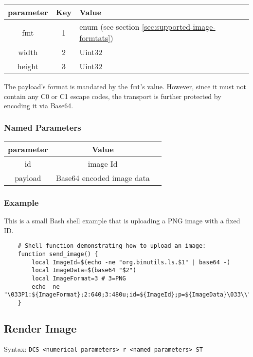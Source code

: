 \documentclass{article}
\newcommand{\code}[1]{\colorbox{light-gray}{\texttt{#1}}}
\begin{document}
\begin{tabular}{ |c|c|l| }
    \hline
    \textbf{parameter}   & \textbf{Key} & \textbf{Value} \\
    \hline
    fmt         & 1   & enum (see section \ref{sec:supported-image-formtats}) \\
    width       & 2   & Uint32 \\
    height      & 3   & Uint32 \\
    \hline
\end{tabular}

The payload's format is mandated by the \code{fmt}'s value. However, since it must not contain
any C0 or C1 escape codes, the transport is further protected by encoding it via Base64.

\subsubsection*{Named Parameters}

\begin{tabular}{ |c|c|l| }
    \hline
    \textbf{parameter}   & \textbf{Value} \\
    \hline
    id          & image Id \\
    payload     & Base64 encoded image data \\
    \hline
\end{tabular}

\subsubsection*{Example}

This is a small Bash shell example that is uploading a PNG image with a fixed ID.

\begin{verbatim}
    # Shell function demonstrating how to upload an image:
    function send_image() {
        local ImageId=$(echo -ne "org.binutils.ls.$1" | base64 -)
        local ImageData=$(base64 "$2")
        local ImageFormat=3 # 3=PNG
        echo -ne "\033P1:${ImageFormat};2:640;3:480u;id=${ImageId};p=${ImageData}\033\\"
    }
\end{verbatim}

\subsection{Render Image}

Syntax: \code{DCS <numerical parameters> r <named parameters> ST}
\end{document}
